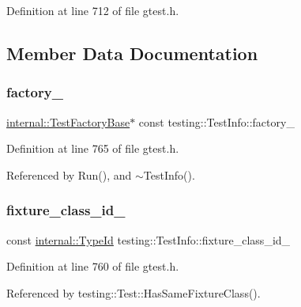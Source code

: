 Definition at line 712 of file gtest.\+h.



\subsection{Member Data Documentation}
\mbox{\label{classtesting_1_1TestInfo_a6bf2422602b877c73f6eb169a63cfea8}} 
\subsubsection{\texorpdfstring{factory\+\_\+}{factory\_}}
{\footnotesize\ttfamily \hyperlink{classtesting_1_1internal_1_1TestFactoryBase}{internal\+::\+Test\+Factory\+Base}$\ast$ const testing\+::\+Test\+Info\+::factory\+\_\+\hspace{0.3cm}{\ttfamily [private]}}



Definition at line 765 of file gtest.\+h.



Referenced by Run(), and $\sim$\+Test\+Info().

\mbox{\label{classtesting_1_1TestInfo_ad3284b7b9ebe61cc31440694091450ae}} 
\subsubsection{\texorpdfstring{fixture\+\_\+class\+\_\+id\+\_\+}{fixture\_class\_id\_}}
{\footnotesize\ttfamily const \hyperlink{namespacetesting_1_1internal_ab1114197d3c657d8b7f8e0c5caa12d00}{internal\+::\+Type\+Id} testing\+::\+Test\+Info\+::fixture\+\_\+class\+\_\+id\+\_\+\hspace{0.3cm}{\ttfamily [private]}}



Definition at line 760 of file gtest.\+h.



Referenced by testing\+::\+Test\+::\+Has\+Same\+Fixture\+Class().

